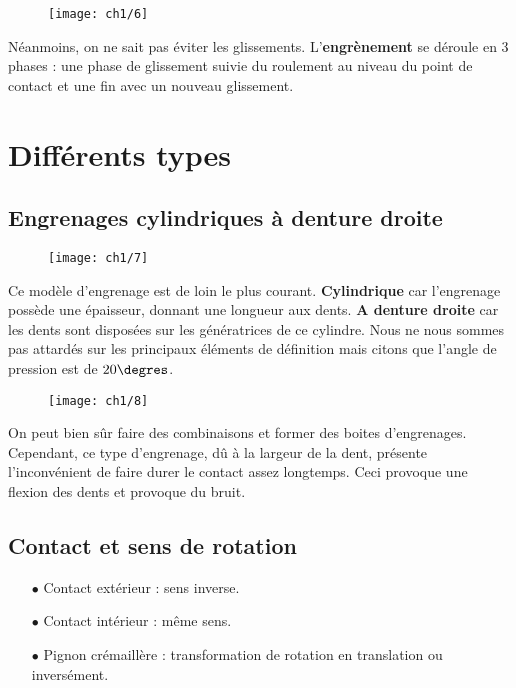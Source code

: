 	\begin{wrapfigure}[5]{r}{5.6cm}
	\vspace{-5mm}
	\texttt{[image: ch1/6]}
	\end{wrapfigure}	
	\noindent Néanmoins, on ne sait pas éviter les glissements. L'\textbf{engrènement} se déroule en 3 phases : une phase de glissement suivie du roulement au niveau du point de contact et une fin avec un nouveau glissement. 

\section{Différents types}
\subsection{Engrenages cylindriques à denture droite}
	\begin{wrapfigure}[5]{l}{2.5cm}
	\vspace{-5mm}
	\texttt{[image: ch1/7]}
	\end{wrapfigure}	
	\noindent Ce modèle d'engrenage est de loin le plus courant. \textbf{Cylindrique} car l'engrenage possède une épaisseur, donnant une longueur aux dents. \textbf{A denture droite} car les dents sont disposées sur les génératrices de ce cylindre. Nous ne nous sommes pas attardés sur les principaux éléments de définition mais citons que l'angle de pression est de $20\degres$. \\
	
	\begin{wrapfigure}[5]{r}{2.5cm}
	\vspace{-5mm}
	\texttt{[image: ch1/8]}
	\end{wrapfigure}	
	\noindent On peut bien sûr faire des combinaisons et former des boites d'engrenages. Cependant, ce type d'engrenage, dû à la largeur de la dent, présente l'inconvénient de faire durer le contact assez longtemps. Ceci provoque une flexion des dents et provoque du bruit.
	
\subsection{Contact et sens de rotation}
	\begin{itemize}
	\item[$\bullet$] Contact extérieur : sens inverse.
	\item[$\bullet$] Contact intérieur : même sens.
	\item[$\bullet$] Pignon crémaillère : transformation de rotation en translation ou inversément. 
	\end{itemize}
	
